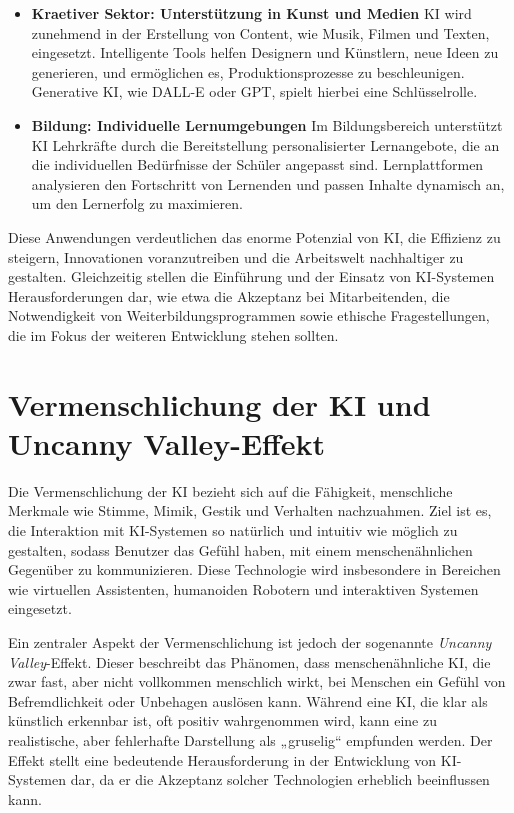 \documentclass[a4paper,12pt]{article}
\begin{document}
\begin{itemize}
\item \textbf{Kraetiver Sektor: Unterstützung in Kunst und Medien}  
KI wird zunehmend in der Erstellung von Content, wie Musik, Filmen und Texten, eingesetzt. Intelligente Tools helfen Designern und Künstlern, neue Ideen zu generieren, und ermöglichen es, Produktionsprozesse zu beschleunigen. Generative KI, wie DALL-E oder GPT, spielt hierbei eine Schlüsselrolle.

\item \textbf{Bildung: Individuelle Lernumgebungen}  
Im Bildungsbereich unterstützt KI Lehrkräfte durch die Bereitstellung personalisierter Lernangebote, die an die individuellen Bedürfnisse der Schüler angepasst sind. Lernplattformen analysieren den Fortschritt von Lernenden und passen Inhalte dynamisch an, um den Lernerfolg zu maximieren.

\end{itemize}

Diese Anwendungen verdeutlichen das enorme Potenzial von KI, die Effizienz zu steigern, Innovationen voranzutreiben und die Arbeitswelt nachhaltiger zu gestalten. Gleichzeitig stellen die Einführung und der Einsatz von KI-Systemen Herausforderungen dar, wie etwa die Akzeptanz bei Mitarbeitenden, die Notwendigkeit von Weiterbildungsprogrammen sowie ethische Fragestellungen, die im Fokus der weiteren Entwicklung stehen sollten.


\section{Vermenschlichung der KI und Uncanny Valley-Effekt}

Die Vermenschlichung der KI bezieht sich auf die Fähigkeit, menschliche Merkmale wie Stimme, Mimik, Gestik und Verhalten nachzuahmen. Ziel ist es, die Interaktion mit KI-Systemen so natürlich und intuitiv wie möglich zu gestalten, sodass Benutzer das Gefühl haben, mit einem menschenähnlichen Gegenüber zu kommunizieren. Diese Technologie wird insbesondere in Bereichen wie virtuellen Assistenten, humanoiden Robotern und interaktiven Systemen eingesetzt.

Ein zentraler Aspekt der Vermenschlichung ist jedoch der sogenannte \textit{Uncanny Valley}-Effekt. Dieser beschreibt das Phänomen, dass menschenähnliche KI, die zwar fast, aber nicht vollkommen menschlich wirkt, bei Menschen ein Gefühl von Befremdlichkeit oder Unbehagen auslösen kann. Während eine KI, die klar als künstlich erkennbar ist, oft positiv wahrgenommen wird, kann eine zu realistische, aber fehlerhafte Darstellung als „gruselig“ empfunden werden. Der Effekt stellt eine bedeutende Herausforderung in der Entwicklung von KI-Systemen dar, da er die Akzeptanz solcher Technologien erheblich beeinflussen kann.
\end{document}
